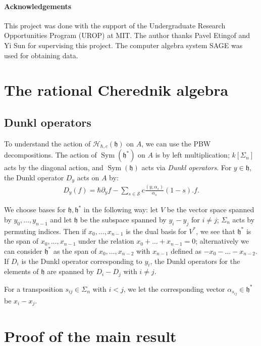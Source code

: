 \documentclass{article}
\numberwithin{equation}{section}
\newcommand{\h}{\mathfrak{h}}
\newcommand{\HH}{\mathcal{H}}
\newcommand{\Sym}{\operatorname{Sym}}
\begin{document}

\paragraph{Acknowledgements} This project was done with the support of the Undergraduate Research Opportunities Program (UROP) at MIT. The author thanks Pavel Etingof and Yi Sun for supervising this project. The computer algebra system SAGE was used for obtaining data.

 \section{The rational Cherednik algebra}
 
 \subsection{Dunkl operators}

To understand the action of $\HH_{\hbar,c}(\h)$ on $A$, we can use the PBW decompositions. The action of $\Sym(\h^*)$ on $A$ is by left multiplication; $k[\Sigma_n]$ acts by the diagonal action, and $\Sym(\h)$ acts via {\it Dunkl operators}. For $y \in \h$, the Dunkl operator $D_y$ acts on $A$ by:
\begin{align*}
D_y(f) = \hbar \partial_y f  - \sum_{s \in \mathcal{S}} c \frac{ ( y, \alpha_s )}{\alpha_s} (1-s). f.
\end{align*}

We choose bases for $\h,\h^*$ in the following way: let $V$ be the vector space spanned by $y_0,\dots,y_{n-1}$ and let $\h$ be the subspace spanned by $y_i-y_j$ for $i \ne j$; $\Sigma_n$ acts by permuting indices. Then if $x_0,\dots,x_{n-1}$ is the dual basis for $V^*$, we see that $\h^*$ is the span of $x_0,\dots,x_{n-1}$ under the relation $x_0+\dots+x_{n-1}=0$; alternatively we can consider $\h^*$ as the span of $x_0,\dots,x_{n-2}$ with $x_{n-1}$ defined as $-x_0-\dots-x_{n-2}$.  If $D_i$ is the Dunkl operator corresponding to $y_i$, the Dunkl operators for the elements of $\h$ are spanned by $D_i-D_j$ with $i \ne j$. 

For a transposition $s_{ij} \in \Sigma_n$ with $i<j$, we let the corresponding vector $\alpha_{s_{ij}} \in \h^*$ be $x_i-x_j$.



\section{Proof of the main result}
\end{document}
